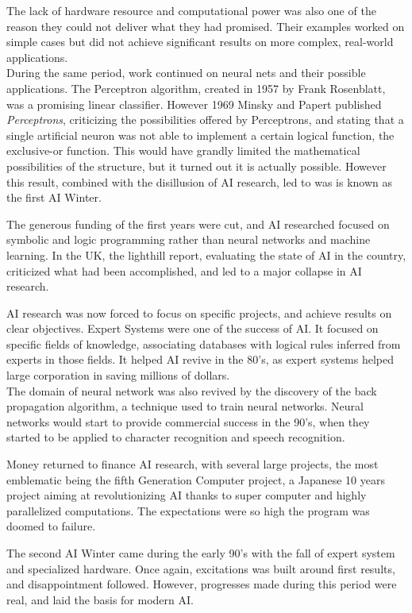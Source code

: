 \documentclass[12pt]{article}
\begin{document}
The lack of hardware resource and computational power was also one of the reason
they could not deliver what they had promised. Their examples worked on simple
cases but did not achieve significant results on more complex, real-world
applications.\\

During the same period, work continued on neural nets and their possible
applications. The Perceptron algorithm, created in 1957 by Frank Rosenblatt, was
a promising linear classifier. However 1969 Minsky and Papert published {\em
Perceptrons}, criticizing the possibilities offered by Perceptrons, and stating
that a single artificial neuron was not able to implement a certain logical
function, the exclusive-or function. This would have grandly limited the mathematical
possibilities of the structure, but it turned out it is actually possible. However
this result, combined with the disillusion of AI research, led to was is known as
the first AI Winter.

The generous funding of the first years were cut, and AI researched focused on
symbolic and logic programming rather than neural networks and machine learning.
In the UK, the lighthill report, evaluating the state of AI in the country,
criticized what had been accomplished, and led to a major collapse in AI
research.

AI research was now forced to focus on specific projects, and achieve results on
clear objectives. Expert Systems were one of the success of AI. It focused on
specific fields of knowledge, associating databases with logical rules
inferred from experts in those fields. It helped AI revive in the 80's, as expert
systems helped large corporation in saving millions of dollars.\\

The domain of neural network was also revived by the discovery of the back
propagation algorithm, a technique used to train neural networks. Neural
networks would start to provide commercial success in the 90's, when they
started to be  applied to character recognition and speech recognition.

Money returned to finance AI research, with several large projects, the most
emblematic being the fifth Generation Computer project, a Japanese 10 years
project aiming at revolutionizing AI thanks to super computer and highly
parallelized computations. The expectations were so high the program was doomed
to failure.

The second AI Winter came during the early 90's with the fall of expert system
and  specialized hardware. Once again, excitations was built around first
results, and  disappointment followed. However, progresses made during this
period were real,  and laid the basis for modern AI.\\
\end{document}
